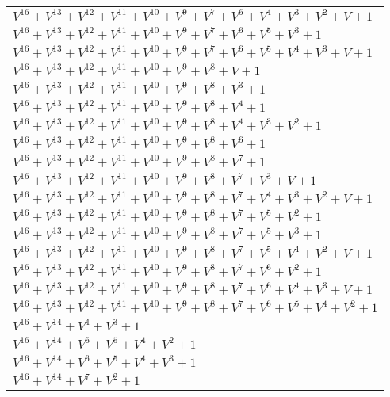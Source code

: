\documentclass[12pt]{article}
\begin{document}
\begin{adjustwidth}{-4cm}{}
\begin{center}
\begin{longtable}{|l|}
$V^{16}  +V^{13}  +V^{12}  +V^{11}  +V^{10}  +V^{9}  +V^{7}  +V^{6}  +V^{4}  +V^{3}  +V^{2}  + V + 1$ \\
$V^{16}  +V^{13}  +V^{12}  +V^{11}  +V^{10}  +V^{9}  +V^{7}  +V^{6}  +V^{5}  +V^{3}  + 1$ \\
$V^{16}  +V^{13}  +V^{12}  +V^{11}  +V^{10}  +V^{9}  +V^{7}  +V^{6}  +V^{5}  +V^{4}  +V^{3}  + V + 1$ \\
$V^{16}  +V^{13}  +V^{12}  +V^{11}  +V^{10}  +V^{9}  +V^{8}  + V + 1$ \\
$V^{16}  +V^{13}  +V^{12}  +V^{11}  +V^{10}  +V^{9}  +V^{8}  +V^{3}  + 1$ \\
$V^{16}  +V^{13}  +V^{12}  +V^{11}  +V^{10}  +V^{9}  +V^{8}  +V^{4}  + 1$ \\
$V^{16}  +V^{13}  +V^{12}  +V^{11}  +V^{10}  +V^{9}  +V^{8}  +V^{4}  +V^{3}  +V^{2}  + 1$ \\
$V^{16}  +V^{13}  +V^{12}  +V^{11}  +V^{10}  +V^{9}  +V^{8}  +V^{6}  + 1$ \\
$V^{16}  +V^{13}  +V^{12}  +V^{11}  +V^{10}  +V^{9}  +V^{8}  +V^{7}  + 1$ \\
$V^{16}  +V^{13}  +V^{12}  +V^{11}  +V^{10}  +V^{9}  +V^{8}  +V^{7}  +V^{3}  + V + 1$ \\
$V^{16}  +V^{13}  +V^{12}  +V^{11}  +V^{10}  +V^{9}  +V^{8}  +V^{7}  +V^{4}  +V^{3}  +V^{2}  + V + 1$ \\
$V^{16}  +V^{13}  +V^{12}  +V^{11}  +V^{10}  +V^{9}  +V^{8}  +V^{7}  +V^{5}  +V^{2}  + 1$ \\
$V^{16}  +V^{13}  +V^{12}  +V^{11}  +V^{10}  +V^{9}  +V^{8}  +V^{7}  +V^{5}  +V^{3}  + 1$ \\
$V^{16}  +V^{13}  +V^{12}  +V^{11}  +V^{10}  +V^{9}  +V^{8}  +V^{7}  +V^{5}  +V^{4}  +V^{2}  + V + 1$ \\
$V^{16}  +V^{13}  +V^{12}  +V^{11}  +V^{10}  +V^{9}  +V^{8}  +V^{7}  +V^{6}  +V^{2}  + 1$ \\
$V^{16}  +V^{13}  +V^{12}  +V^{11}  +V^{10}  +V^{9}  +V^{8}  +V^{7}  +V^{6}  +V^{4}  +V^{3}  + V + 1$ \\
$V^{16}  +V^{13}  +V^{12}  +V^{11}  +V^{10}  +V^{9}  +V^{8}  +V^{7}  +V^{6}  +V^{5}  +V^{4}  +V^{2}  + 1$ \\
$V^{16}  +V^{14}  +V^{4}  +V^{3}  + 1$ \\
$V^{16}  +V^{14}  +V^{6}  +V^{5}  +V^{4}  +V^{2}  + 1$ \\
$V^{16}  +V^{14}  +V^{6}  +V^{5}  +V^{4}  +V^{3}  + 1$ \\
$V^{16}  +V^{14}  +V^{7}  +V^{2}  + 1$ \\

\end{longtable}
\end{center}
\end{adjustwidth}
\end{document}
